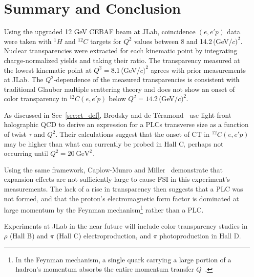 \chapter{Summary and Conclusion}
Using the upgraded 12\,\,GeV CEBAF beam at JLab, coincidence $(e,e'p)$ data
were taken with $^{1}H$ and $^{12}C$ targets for $Q^2$ values between 8 and
14.2\,(GeV/$c)^2$.
Nuclear transparencies were extracted for each kinematic point by integrating
charge-normalized yields and taking their ratio.
The transparency measured at the lowest kinematic point at
$Q^2=8.1$\,(GeV/$c)^2$ agrees with prior measurements at JLab.
The $Q^2$-dependence of the measured transparencies is consistent with
traditional Glauber multiple scattering theory and does not show an onset of
color transparency in $^{12}C(e,e'p)$ below $Q^2=14.2$\,(GeV/$c)^2$.

As discussed in Sec~\ref{sec:ct_def}, Brodsky and de Téramond~\cite{Brodsky_2021}
use light-front holographic QCD to derive an expression for a PLCs transverse
size as a function of twist $\tau$ and $Q^2$.
Their calculations suggest that the onset of CT in ${}^{12}C(e,e'p)$ may be
higher than what can currently be probed in Hall C, perhaps not occurring
until $Q^2=\SI{20}{\giga\electronvolt\squared}$.

Using the same framework, Caplow-Munro and Miller~\cite{CaplowMunro_2021}
demonstrate that expansion effects are not sufficiently large to cause FSI in
this experiment's measurements.
The lack of a rise in transparency then suggests that a PLC was not formed,
and that the proton's electromagnetic form factor is dominated at large
momentum by the Feynman mechanism\footnote{In the Feynman mechanism, a single
quark carrying a large portion of a hadron's momentum absorbs the entire
momentum transfer $Q$~\cite{Drell_1970}.} rather than a PLC.

Experiments at JLab in the near future will include color transparency studies in $\rho$ (Hall B) and $\pi$ (Hall C) electroproduction, and $\pi$ photoproduction in Hall D.
